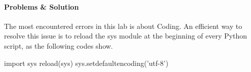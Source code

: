 \documentclass{article}
\begin{document}
\paragraph{Problems \& Solution}
The most encountered errors in this lab is about Coding. An efficient way to resolve this issue is to reload the sys module at the beginning of every Python script, as the following codes show.

\begin{python}
import sys
reload(sys)
sys.setdefaultencoding('utf-8')
\end{python}
\end{document}
